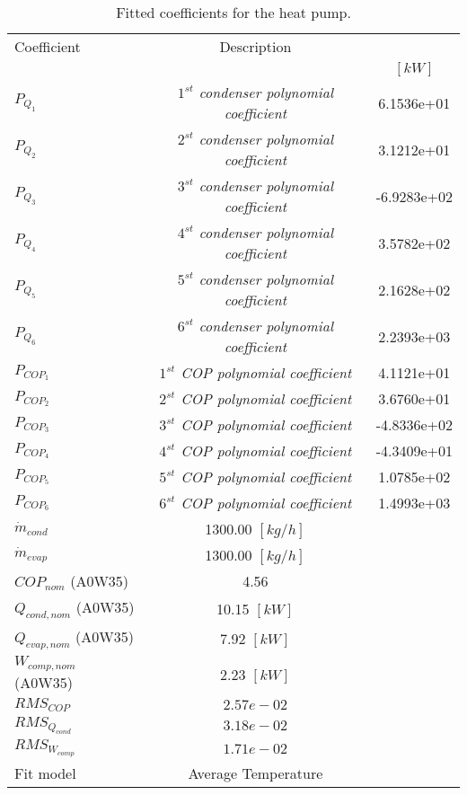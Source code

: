 \documentclass[english]{SPFShortReport}
\author{Dani Carbonell}
\begin{document}
\begin{table}[!ht]
\begin{small}
\caption{Fitted coefficients for the heat pump.}
\begin{center}
\resizebox{12cm}{!} 
{
\begin{tabular}{l | c c } 
\hline
\hline
Coefficient &Description & \\ 
 & &$[kW]$\\ 
\hline
$P_{Q_{1}}$ & \emph{$1^{st}$ condenser polynomial coefficient}  & 6.1536e+01    \\ 
$P_{Q_{2}}$ & \emph{$2^{st}$ condenser polynomial coefficient}  & 3.1212e+01    \\ 
$P_{Q_{3}}$ & \emph{$3^{st}$ condenser polynomial coefficient}  & -6.9283e+02    \\ 
$P_{Q_{4}}$ & \emph{$4^{st}$ condenser polynomial coefficient}  & 3.5782e+02    \\ 
$P_{Q_{5}}$ & \emph{$5^{st}$ condenser polynomial coefficient}  & 2.1628e+02    \\ 
$P_{Q_{6}}$ & \emph{$6^{st}$ condenser polynomial coefficient}  & 2.2393e+03    \\ 
\hline
$P_{COP_{1}}$ & \emph{$1^{st}$ COP polynomial coefficient}  & 4.1121e+01    \\ 
$P_{COP_{2}}$ & \emph{$2^{st}$ COP polynomial coefficient}  & 3.6760e+01    \\ 
$P_{COP_{3}}$ & \emph{$3^{st}$ COP polynomial coefficient}  & -4.8336e+02    \\ 
$P_{COP_{4}}$ & \emph{$4^{st}$ COP polynomial coefficient}  & -4.3409e+01    \\ 
$P_{COP_{5}}$ & \emph{$5^{st}$ COP polynomial coefficient}  & 1.0785e+02    \\ 
$P_{COP_{6}}$ & \emph{$6^{st}$ COP polynomial coefficient}  & 1.4993e+03    \\ 
\hline
$\dot m_{cond}$ & 1300.00 $[kg/h]$ \\ 
$\dot m_{evap}$ & 1300.00 $[kg/h]$ \\ 
\hline
$COP_{nom}$ (A0W35)& 4.56 \\ 
$Q_{cond,nom}$ (A0W35)& 10.15 $[kW]$\\ 
$Q_{evap,nom}$ (A0W35)& 7.92 $[kW]$\\ 
$W_{comp,nom}$ (A0W35)& 2.23 $[kW]$\\ 
\hline
 $RMS_{COP}$ & $2.57e-02$ \\ 
 $RMS_{Q_{cond}}$ & $3.18e-02$ \\ 
 $RMS_{W_{comp}}$ & $1.71e-02$ \\ 
\hline
Fit model & Average Temperature\\ 
\hline
\hline
\end{tabular}
}
\label{CoefTable}
\end{center}
\end{small}
\end{table}
\end{document}
